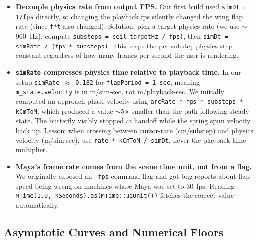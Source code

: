 \documentclass[12pt]{article}
\begin{document}
\begin{itemize}
  \item \textbf{Decouple physics rate from output FPS.}  Our first build
    used \texttt{simDt = 1/fps} directly, so changing the playback fps
    silently changed the wing flap rate (since \texttt{f*t} also changed).
    Solution: pick a target physics rate (we use $\sim$960~Hz), compute
    \texttt{substeps = ceil(targetHz / fps)}, then \texttt{simDt = simRate /
    (fps * substeps)}.  This keeps the per-substep physics step constant
    regardless of how many frames-per-second the user is rendering.

  \item \textbf{\texttt{simRate} compresses physics time relative to
    playback time.}  In our setup \texttt{simRate $\approx$ 0.182} for
    \texttt{flapPeriod = 1\,sec}, meaning \texttt{m\_state.velocity} is in
    m/sim-sec, not m/playback-sec.  We initially computed an approach-phase
    velocity using \texttt{arcRate * fps * substeps * kCmToM}, which
    produced a value $\sim$5$\times$ smaller than the path-following
    steady-state.  The butterfly visibly stopped at handoff while the
    spring spun velocity back up.  Lesson: when crossing between
    cursor-rate (cm/substep) and physics velocity (m/sim-sec), use
    \texttt{rate * kCmToM / simDt}, never the playback-time multiplier.

  \item \textbf{Maya's frame rate comes from the scene time unit, not from
    a flag.}  We originally exposed an \texttt{-fps} command flag and got
    bug reports about flap speed being wrong on machines whose Maya was set
    to 30~fps.  Reading \texttt{MTime(1.0, kSeconds).as(MTime::uiUnit())}
    fetches the correct value automatically.
\end{itemize}

\subsection*{Asymptotic Curves and Numerical Floors}
\end{document}
